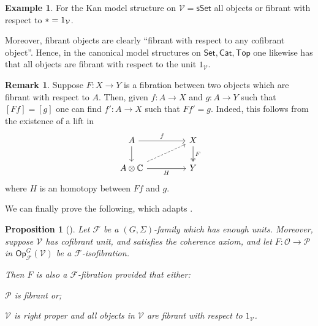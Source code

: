 \documentclass[a4paper,10pt
,draft
]{article}%
\numberwithin{equation}{section}
\numberwithin{figure}{section}
\newtheorem{proposition}[equation]{Proposition}%
\theoremstyle{definition} %
\newtheorem{example}[equation]{Example}%
\newtheorem{remark}[equation]{Remark}%
\newcommand{\Op}{\mathsf{Op}}%
\newcommand{\F}{\ensuremath{\mathcal F}}
\newcommand{\V}{\ensuremath{\mathcal V}}
\renewcommand{\O}{\ensuremath{\mathcal O}}
\renewcommand{\P}{\ensuremath{\mathcal P}}
\newcommand{\1}{\ensuremath{\mathbbm 1}}%
\begin{document}
\begin{example}
For the Kan model structure on $\V=\mathsf{sSet}$
all objects or fibrant with respect to $\** = 1_{\V}$.

Moreover, fibrant objects are clearly ``fibrant with respect to any cofibrant object''.
Hence, in the canonical model structures on 
$\mathsf{Set}, \mathsf{Cat}, \mathsf{Top}$
one likewise has that all objects are fibrant with respect to the unit
$1_{\V}$.
\end{example}


\begin{remark}\label{RELFIBLIFT REM}
Suppose $F\colon X \to Y$ is a fibration between two objects
which are fibrant with respect to $A$.
Then, given 
$f\colon A \to X$ and $g \colon A \to Y$
such that
$[Ff] = [g]$
one can find 
$f'\colon A \to X$ such that $Ff' =g$.
Indeed, this follows from the existence of a 
lift in 
\begin{equation}
\begin{tikzcd}[column sep = 45pt]
	A \ar{d} \ar{r}{f}
&
	X \ar[twoheadrightarrow]{d}{F}
\\
	A \otimes \mathbb{C} \ar{r}[swap]{H} \ar[dashed]{ru}
&
	Y
\end{tikzcd}
\end{equation}
where $H$ is an homotopy between $Ff$ and $g$.
\end{remark}




We can finally prove the following, which adapts
\cite[Props. 2.5]{Ber07b}.

\begin{proposition}[{\cite[Prop. 2.5]{Ber07b}}]
\label{ISOFIBHARD PROP}
Let $\F$ be a $(G,\Sigma)$-family which has enough units.
Moreover, suppose $\V$ has cofibrant unit,
and satisfies the coherence axiom,
and let $F: \O \to \P$ in $\Op^G_\F(\V)$
be a $\F$-isofibration.

Then $F$ is also a $\F$-fibration
provided that either:
\begin{enumerate*}[label = (\roman*)]
\item $\P$ is fibrant or;
\item $\V$ is right proper and
all objects in $\V$ are fibrant with respect to $1_{\V}$.
\end{enumerate*}
\end{proposition}
\end{document}
